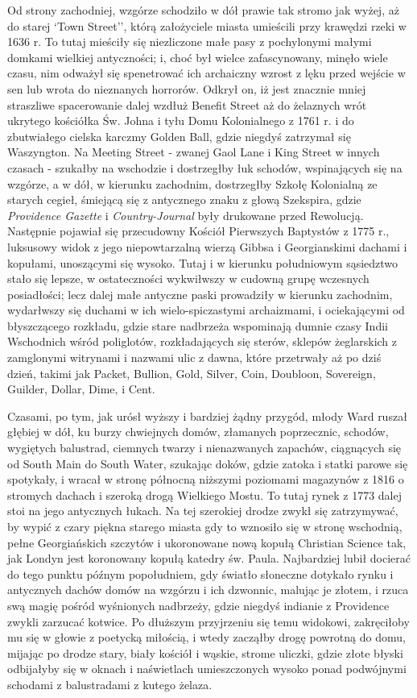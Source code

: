 Od strony zachodniej, wzgórze schodziło w dół prawie tak stromo jak wyżej, aż do starej `Town Street'', którą założyciele miasta umieścili przy krawędzi rzeki w 1636 r. To tutaj mieściły się niezliczone małe pasy z pochylonymi małymi domkami wielkiej antyczności; i, choć był wielce zafascynowany, minęło wiele czasu, nim odważył się spenetrować ich archaiczny wzrost z lęku przed wejście w sen lub wrota do nieznanych horrorów. Odkrył on, iż jest znacznie mniej straszliwe spacerowanie dalej wzdłuż Benefit Street aż do żelaznych wrót ukrytego kościółka Św. Johna i tyłu Domu Kolonialnego z 1761 r. i do zbutwiałego cielska karczmy Golden Ball, gdzie niegdyś zatrzymał się Waszyngton. Na Meeting Street  - zwanej Gaol Lane i King Street w innych czasach - szukałby na wschodzie i dostrzegłby łuk schodów, wspinających się na wzgórze, a w dół, w kierunku zachodnim, dostrzegłby Szkołę Kolonialną ze starych cegieł,  śmiejącą się z antycznego znaku z głową Szekspira, gdzie \textit{Providence Gazette} i \textit{Country-Journal} były drukowane przed Rewolucją. Następnie pojawiał się przecudowny Kościół Pierwszych Baptystów z 1775 r., luksusowy widok z jego niepowtarzalną wierzą Gibbsa i Georgianskimi dachami i kopułami, unoszącymi się wysoko. Tutaj i w kierunku południowym sąsiedztwo stało się lepsze, w ostateczności wykwiłwszy w cudowną grupę wczesnych posiadłości; lecz dalej małe antyczne paski prowadziły w kierunku zachodnim, wydarłwszy się duchami w ich wielo-spiczastymi archaizmami, i ociekającymi od błyszczącego rozkładu, gdzie stare nadbrzeża wspominają dumnie czasy Indii Wschodnich wśród poliglotów, rozkładających się sterów, sklepów żeglarskich z zamglonymi witrynami i nazwami ulic z dawna, które przetrwały aż po dziś dzień, takimi jak Packet, Bullion, Gold, Silver, Coin, Doubloon, Sovereign, Guilder, Dollar, Dime, i Cent.

Czasami, po tym, jak urósł wyższy i bardziej żądny przygód, młody Ward ruszał głębiej w dół, ku burzy chwiejnych domów, złamanych poprzecznic, schodów, wygiętych balustrad, ciemnych twarzy i nienazwanych zapachów, ciągnących się od South Main do South Water, szukając doków, gdzie zatoka i statki parowe się spotykały, i wracał w stronę północną niższymi poziomami magazynów z 1816 o stromych dachach i szeroką drogą Wielkiego Mostu. To tutaj rynek z 1773 dalej stoi na jego antycznych łukach. Na tej szerokiej drodze zwykł się zatrzymywać, by wypić z czary piękna starego miasta gdy to wznosiło się w stronę wschodnią, pełne Georgiańskich szczytów i ukoronowane nową kopułą Christian Science tak, jak Londyn jest koronowany kopułą katedry św. Paula. Najbardziej lubił docierać do tego punktu późnym popołudniem, gdy światło słoneczne dotykało rynku i antycznych dachów domów na wzgórzu i ich dzwonnic, malując je złotem, i rzuca swą magię pośród wyśnionych nadbrzeży, gdzie niegdyś indianie z Providence zwykli zarzucać kotwice. Po dłuższym przyjrzeniu się temu widokowi, zakręciłoby mu się w głowie z poetycką miłością, i wtedy zacząłby drogę powrotną do domu, mijając po drodze stary, biały kościół i wąskie, strome uliczki, gdzie złote błyski odbijałyby się w oknach i naświetlach umieszczonych wysoko ponad podwójnymi schodami z balustradami z kutego żelaza. 

